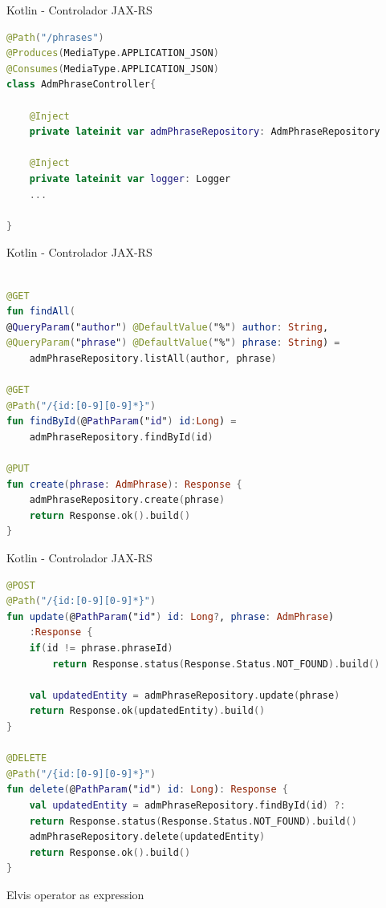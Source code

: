 \documentclass{beamer}
\begin{document}
\begin{frame}[fragile]{Kotlin - Controlador JAX-RS}
\begin{lstlisting}[language=Kotlin, basicstyle=\scriptsize]
@Path("/phrases")
@Produces(MediaType.APPLICATION_JSON)
@Consumes(MediaType.APPLICATION_JSON)
class AdmPhraseController{

	@Inject
	private lateinit var admPhraseRepository: AdmPhraseRepository
	
	@Inject
	private lateinit var logger: Logger
	...

}
\end{lstlisting}
\end{frame}

\begin{frame}[fragile]{Kotlin - Controlador JAX-RS}
\begin{lstlisting}[language=Kotlin, basicstyle=\scriptsize]

@GET
fun findAll(
@QueryParam("author") @DefaultValue("%") author: String,
@QueryParam("phrase") @DefaultValue("%") phrase: String) =
	admPhraseRepository.listAll(author, phrase)

@GET
@Path("/{id:[0-9][0-9]*}")
fun findById(@PathParam("id") id:Long) =
	admPhraseRepository.findById(id)

@PUT
fun create(phrase: AdmPhrase): Response {
	admPhraseRepository.create(phrase)
	return Response.ok().build()
}
\end{lstlisting}
\end{frame}


\begin{frame}[fragile]{Kotlin - Controlador JAX-RS}
\begin{lstlisting}[language=Kotlin, basicstyle=\scriptsize]
@POST
@Path("/{id:[0-9][0-9]*}")
fun update(@PathParam("id") id: Long?, phrase: AdmPhrase)
	:Response {
	if(id != phrase.phraseId) 
		return Response.status(Response.Status.NOT_FOUND).build()
	
	val updatedEntity = admPhraseRepository.update(phrase)
	return Response.ok(updatedEntity).build()
}

@DELETE
@Path("/{id:[0-9][0-9]*}")
fun delete(@PathParam("id") id: Long): Response {
	val updatedEntity = admPhraseRepository.findById(id) ?:
	return Response.status(Response.Status.NOT_FOUND).build()
	admPhraseRepository.delete(updatedEntity)
	return Response.ok().build()
}
\end{lstlisting}
Elvis operator as expression
\end{frame}
\end{document}
